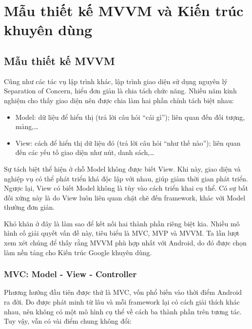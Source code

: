 \documentclass[../../thesis]{subfiles}
\begin{document}

\section{Mẫu thiết kế MVVM và Kiến trúc khuyên dùng}\label{sec:mvvm-app-arch}

\subsection{Mẫu thiết kế MVVM}\label{sec:mvvm}

Cũng như các tác vụ lập trình khác, lập trình giao diện sử dụng nguyên lý
Separation of Concern, hiểu đơn giản là chia tách chức năng. Nhiều năm kinh
nghiệm cho thấy giao diện nên được chia làm hai phần chính tách biệt nhau:

\begin{itemize}
    \item
        Model: dữ liệu để hiển thị (trả lời câu hỏi ``cái gì''); liên quan đến
        đối tượng, mảng,\ldots
    \item
        View: cách để hiển thị dữ liệu đó (trả lời câu hỏi ``như thế nào'');
        liên quan đến các yếu tố giao diện như nút, danh sách,\ldots
\end{itemize}

Sự tách biệt thể hiện ở chỗ Model không được biết View. Khi này, giao diện và
nghiệp vụ có thể phát triển khá độc lập với nhau, giúp giảm thời gian phát
triển. Ngược lại, View có biết Model không là tùy vào cách triển khai cụ thể. Có
sự bất đối xứng này là do View luôn liên quan chặt chẽ đến framework, khác với
Model thường đơn giản.

Khó khăn ở đây là làm sao để kết nối hai thành phần riêng biệt kia. Nhiều mô
hình cố giải quyết vấn đề này, tiêu biểu là MVC, MVP và MVVM. Ta lần lượt xem
xét chúng để thấy rằng MVVM phù hợp nhất với Android, do đó được chọn làm nền
tảng cho Kiến trúc Google khuyên dùng.

\subsubsection{MVC: Model - View - Controller}

Phương hướng đầu tiên được thử là MVC, vốn phổ biến vào thời điểm Android ra
đời. Do được phát minh từ lâu và mỗi framework lại có cách giải thích khác nhau,
nên không có một mô hình cụ thể về cách ba thành phần trên tương tác. Tuy vậy,
vẫn có vài điểm chung không đổi:
\end{document}
